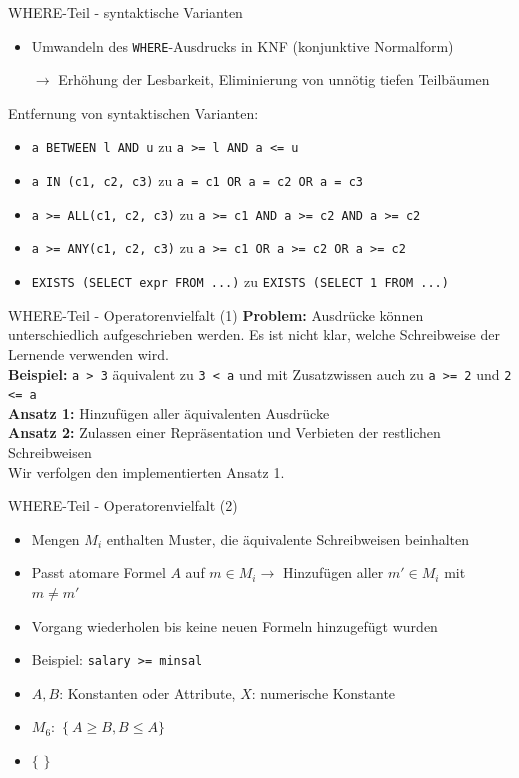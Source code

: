 \documentclass{beamer}
\begin{document}
\begin{frame}[fragile]{WHERE-Teil - syntaktische Varianten}
\begin{itemize}
\item Umwandeln des \verb|WHERE|-Ausdrucks in KNF (konjunktive Normalform) 
\item[$\to$] Erhöhung der Lesbarkeit, Eliminierung von unnötig tiefen Teilbäumen
\end{itemize}
Entfernung von syntaktischen Varianten:
\begin{itemize}
\item \verb|a BETWEEN l AND u| zu \verb|a >= l AND a <= u|
\item \verb|a IN (c1, c2, c3)| zu \verb|a = c1 OR a = c2 OR a = c3|
\item \verb|a >= ALL(c1, c2, c3)| zu \verb|a >= c1 AND a >= c2 AND a >= c2|
\item \verb|a >= ANY(c1, c2, c3)| zu \verb|a >= c1 OR a >= c2 OR a >= c2|
\item \verb|EXISTS (SELECT expr FROM ...)| zu \verb|EXISTS (SELECT 1 FROM ...)|
\end{itemize}
\end{frame}

\begin{frame}[fragile]{WHERE-Teil - Operatorenvielfalt (1)}
\textbf{Problem:} Ausdrücke können unterschiedlich aufgeschrieben werden. Es ist nicht klar, welche Schreibweise der Lernende verwenden wird.\\
\textbf{Beispiel:} \verb|a > 3| äquivalent zu \verb|3 < a| und mit Zusatzwissen auch zu \verb|a >= 2| und \verb|2 <= a|\\
\vspace{5mm}
\textbf{Ansatz 1:} Hinzufügen aller äquivalenten Ausdrücke\\
\textbf{Ansatz 2:} Zulassen einer Repräsentation und Verbieten der restlichen Schreibweisen\\
\vspace{5mm}
Wir verfolgen den implementierten Ansatz 1.
\end{frame}


\begin{frame}[fragile]{WHERE-Teil - Operatorenvielfalt (2)}
\begin{itemize}
\item Mengen $M_i$ enthalten Muster, die äquivalente Schreibweisen beinhalten
\item Passt atomare Formel $A$ auf $m\in M_i \to$ Hinzufügen aller $m'\in M_i$ mit $m\neq m'$
\item Vorgang wiederholen bis keine neuen Formeln hinzugefügt wurden
\item Beispiel: \verb|salary >= minsal|
\item $A,B$: Konstanten oder Attribute, $X$: numerische Konstante
\item $M_6:$  $\{\ A\geq B, B\leq A \}$
\item  $\{$    $\}$ 
\end{itemize}
\end{frame}
\end{document}
